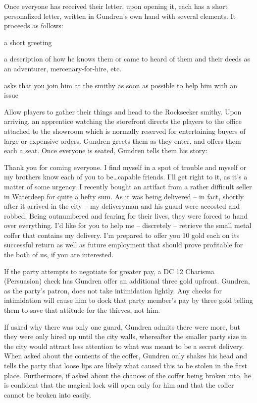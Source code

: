 \documentclass[10pt,twocolumn,openany,nodeprecatedcode,bg=none,inline]{dndbook}
\begin{document}
Once everyone has received their letter, upon opening it, each has a short personalized letter, written in Gundren's own hand with several elements.
It proceeds as follows:
\begin{itemize*}[label={}, itemjoin={;}, after={.}]
  \item a short greeting
  \item a description of how he knows them or came to heard of them and their deeds as an adventurer, mercenary-for-hire, etc.
  \item asks that you join him at the smithy as soon as possible to help him with an issue
\end{itemize*}

Allow players to gather their things and head to the Rockseeker smithy.
Upon arriving, an apprentice watching the storefront directs the players to the office attached to the showroom which is normally reserved for entertaining buyers of large or expensive orders.
Gundren greets them as they enter, and offers them each a seat.
Once everyone is seated, Gundren tells them his story:
\begin{DndReadAloud}
  Thank you for coming everyone.
  I find myself in a spot of trouble and myself or my brothers know each of you to be\dots capable friends.
  I'll get right to it, as it's a matter of some urgency.
  I recently bought an artifact from a rather difficult seller in Waterdeep for quite a hefty sum.
  As it was being delivered -- in fact, shortly after it arrived in the city -- my deliveryman and his guard were accosted and robbed.
  Being outnumbered and fearing for their lives, they were forced to hand over everything.
  I'd like for you to help me -- discretely -- retrieve the small metal coffer that contains my delivery.
  I'm prepared to offer you 10 gold each on its successful return as well as future employment that should prove profitable for the both of us, if you are interested.
\end{DndReadAloud}

If the party attempts to negotiate for greater pay, a DC 12 Charisma (Persuasion) check has Gundren offer an additional three gold upfront. 
Gundren, as the party's patron, does not take intimidation lightly.
Any checks for intimidation will cause him to dock that party member's pay by three gold telling them to save that attitude for the thieves, not him.

If asked why there was only one guard, Gundren admits there were more, but they were only hired up until the city walls, whereafter the smaller party size in the city would attract less attention to what was meant to be a secret delivery.
When asked about the contents of the coffer, Gundren only shakes his head and tells the party that loose lips are likely what caused this to be stolen in the first place.
Furthermore, if asked about the chances of the coffer being broken into, he is confident that the magical lock will open only for him and that the coffer cannot be broken into easily.
\end{document}
